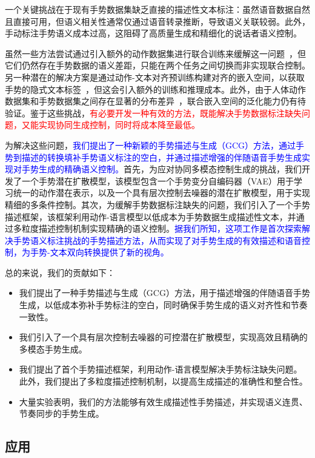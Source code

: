 一个关键挑战在于现有手势数据集缺乏直接的描述性文本标注：虽然语音数据自然且直接可用，但语义相关性通常仅通过语音转录推断，导致语义关联较弱。此外，手动标注手势语义成本过高，这阻碍了高质量生成和精细化的说话者语义控制。

虽然一些方法尝试通过引入额外的动作数据集进行联合训练来缓解这一问题~\cite{yang2024freetalker}，但它们仍然存在手势数据的语义差距，只能在两个任务之间切换而非实现联合控制。另一种潜在的解决方案是通过动作-文本对齐预训练构建对齐的嵌入空间，以获取手势的隐式文本标签~\cite{chen2024syntalker}，但这会引入额外的训练和推理成本。此外，由于人体动作数据集和手势数据集之间存在显著的分布差异~\cite{chen2024syntalker}，联合嵌入空间的泛化能力仍有待验证。鉴于这些挑战，\textcolor{red}{有必要开发一种有效的方法，既能解决手势数据标注缺失问题，又能实现协同生成控制，同时将成本降至最低。}

为解决这些问题，\textcolor{blue}{我们提出了一种新颖的手势描述与生成（GCG）方法，通过手势到描述的转换填补手势语义标注的空白，并通过描述增强的伴随语音手势生成实现对手势生成的精确语义控制。}首先，为应对协同多模态控制生成的挑战，我们开发了一个手势潜在扩散模型，该模型包含一个手势变分自编码器（VAE）用于学习统一的动作潜在表示，以及一个具有层次控制去噪器的潜在扩散模型，用于实现精细的多条件控制。其次，为缓解手势数据标注缺失的问题，我们引入了一个手势描述框架，该框架利用动作-语言模型以低成本为手势数据生成描述性文本，并通过多粒度描述控制机制实现精确的语义控制。\textcolor{blue}{据我们所知，这项工作是首次探索解决手势语义标注挑战的手势描述方法，从而实现了对手势生成的有效描述和语音控制，为手势-文本双向转换提供了新的视角。}

总的来说，我们的贡献如下：
\begin{itemize}
  \item 我们提出了一种手势描述与生成（GCG）方法，用于描述增强的伴随语音手势生成，以低成本弥补手势标注的空白，同时确保手势生成的语义对齐性和节奏一致性。
  \item 我们引入了一个具有层次控制去噪器的可控潜在扩散模型，实现高效且精确的多模态手势生成。
  \item 我们提出了首个手势描述框架，利用动作-语言模型解决手势标注缺失问题。此外，我们提出了多粒度描述控制机制，以提高生成描述的准确性和整合性。
  \item 大量实验表明，我们的方法能够有效生成描述性手势描述，并实现语义连贯、节奏同步的手势生成。
\end{itemize}

\subsection{应用}


